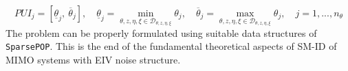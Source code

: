 {\normalsize{
    \begin{equation}
        PUI_j =[\underline{\theta}_j,\ \overline{\theta}_j], \quad \underline{\theta}_j = \min_{{\theta, z, \eta, \xi} \in\mathcal{D}_{\theta, z, \eta, \xi}} \theta_j, \quad
        \overline{\theta}_j = \max_{{\theta, z, \eta, \xi} \in\mathcal{D}_{\theta, z, \eta, \xi}} \theta_j, \quad 
        j=1,...,n_\theta
    \end{equation}
}}
\noindent
The problem can be properly formulated using suitable data structures of \texttt{SparsePOP}. This is the end of the fundamental theoretical aspects of SM-ID of MIMO systems with EIV noise structure.

